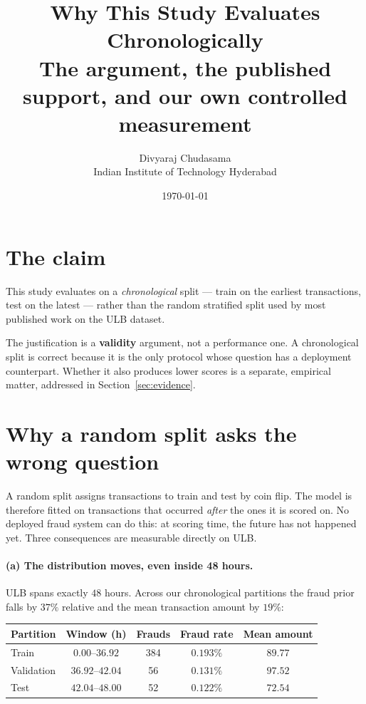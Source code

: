 \documentclass[11pt,a4paper]{article}
\title{\vspace{-1.4cm}\textbf{Why This Study Evaluates Chronologically}\\[0.3cm]
\large The argument, the published support, and our own controlled measurement\\[0.4cm]}
\author{Divyaraj Chudasama \\ Indian Institute of Technology Hyderabad}
\date{\today}
\newcommand{\hi}[1]{\textbf{\textcolor{accent}{#1}}}
\begin{document}
\maketitle

\section{The claim}
This study evaluates on a \emph{chronological} split --- train on the earliest transactions,
test on the latest --- rather than the random stratified split used by most published work on
the ULB dataset.

The justification is a \hi{validity} argument, not a performance one. A chronological split is
correct because it is the only protocol whose question has a deployment counterpart. Whether it
also produces lower scores is a separate, empirical matter, addressed in
Section~\ref{sec:evidence}.

\section{Why a random split asks the wrong question}
A random split assigns transactions to train and test by coin flip. The model is therefore
fitted on transactions that occurred \emph{after} the ones it is scored on. No deployed fraud
system can do this: at scoring time, the future has not happened yet. Three consequences are
measurable directly on ULB.

\paragraph{(a) The distribution moves, even inside 48 hours.}
ULB spans exactly $48$ hours. Across our chronological partitions the fraud prior falls by
$37\%$ relative and the mean transaction amount by $19\%$:

\begin{center}\small
\begin{tabular}{lcccc}
      \toprule
      Partition & Window (h) & Frauds & Fraud rate & Mean amount\\
      \midrule
      Train & $0.00$--$36.92$ & 384 & $0.193\%$ & $89.77$\\
      Validation & $36.92$--$42.04$ & 56 & $0.131\%$ & $97.52$\\
      Test & $42.04$--$48.00$ & 52 & $0.122\%$ & $72.54$\\
      \bottomrule
\end{tabular}
\end{center}
\end{document}
